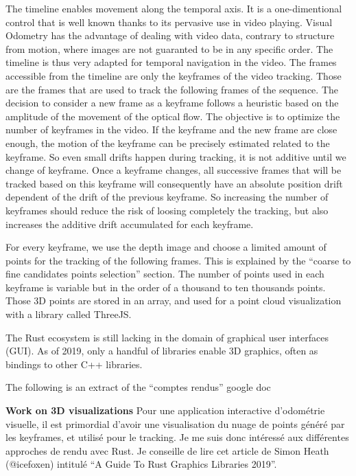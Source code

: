 The timeline enables movement along the temporal axis.
It is a one-dimentional control that is well known thanks to its pervasive use in video playing.
Visual Odometry has the advantage of dealing with video data,
contrary to structure from motion, where images are not guaranted to be in any specific order.
The timeline is thus very adapted for temporal navigation in the video.
The frames accessible from the timeline are only the keyframes of the video tracking.
Those are the frames that are used to track the following frames of the sequence.
The decision to consider a new frame as a keyframe follows a heuristic based on
the amplitude of the movement of the optical flow.
The objective is to optimize the number of keyframes in the video.
If the keyframe and the new frame are close enough,
the motion of the keyframe can be precisely estimated related to the keyframe.
So even small drifts happen during tracking, it is not additive until we change of keyframe.
Once a keyframe changes, all successive frames that will be tracked based on this keyframe
will consequently have an absolute position drift dependent of the drift of the previous keyframe.
So increasing the number of keyframes should reduce the risk of loosing completely the tracking,
but also increases the additive drift accumulated for each keyframe.

For every keyframe, we use the depth image and choose a limited amount of points
for the tracking of the following frames.
This is explained by the ``coarse to fine candidates points selection'' section.
The number of points used in each keyframe is variable but in the order of a thousand
to ten thousands points.
Those 3D points are stored in an array,
and used for a point cloud visualization with a library called ThreeJS.

The Rust ecosystem is still lacking in the domain of graphical user interfaces (GUI).
As of 2019, only a handful of libraries enable 3D graphics,
often as bindings to other C++ libraries.

\alert{The following is an extract of the ``comptes rendus'' google doc}

\textbf{Work on 3D visualizations}
Pour une application interactive d’odométrie visuelle, il est primordial d’avoir une visualisation du nuage de points généré par les keyframes, et utilisé pour le tracking. Je me suis donc intéressé aux différentes approches de rendu avec Rust. Je conseille de lire cet article de Simon Heath (@icefoxen) intitulé “A Guide To Rust Graphics Libraries 2019”.

